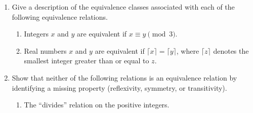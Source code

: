 \documentclass[12pt]{article}
\begin{document}

\begin{enumerate}
\item
Give a description of the equivalence classes associated with each of
the following equivalence relations.

\begin{enumerate}

\item Integers $x$ and $y$ are equivalent if $x \equiv y \pmod{3}$.


\item Real numbers $x$ and $y$ are equivalent if $\lceil x \rceil =
\lceil y \rceil$, where $\lceil z \rceil$ denotes the smallest integer
greater than or equal to $z$.


%

\end{enumerate}


\item
Show that neither of the following relations is an equivalence
relation by identifying a missing property (reflexivity, symmetry, or
transitivity).

\begin{enumerate}

\item The ``divides'' relation on the positive integers.



\end{enumerate}
\end{enumerate}
\end{document}
